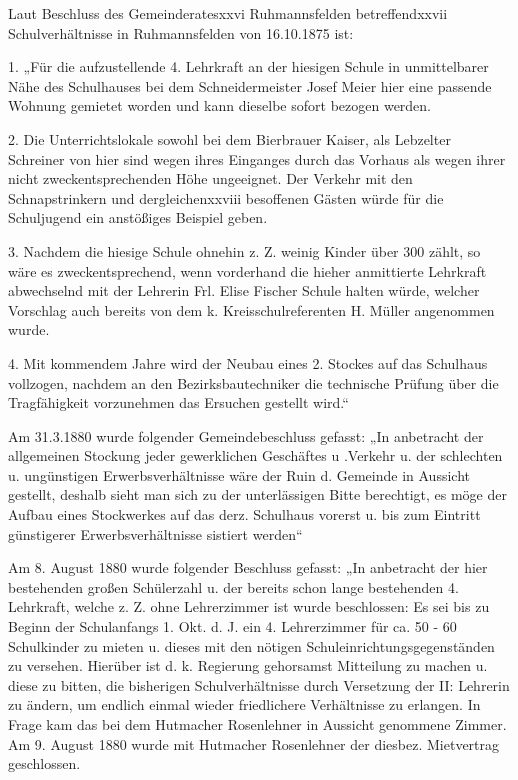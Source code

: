 \documentclass{book}
\begin{document}
Laut Beschluss des Gemeinderatesxxvi Ruhmannsfelden betreffendxxvii
Schulverhältnisse in Ruhmannsfelden von 16.10.1875 ist:



1. „Für die aufzustellende 4. Lehrkraft an der hiesigen Schule in unmittelbarer
Nähe des Schulhauses bei dem Schneidermeister Josef Meier hier eine passende
Wohnung gemietet worden und kann dieselbe sofort bezogen werden.

2. Die Unterrichtslokale sowohl bei dem Bierbrauer Kaiser, als Lebzelter
Schreiner von hier sind wegen ihres Einganges durch das Vorhaus als wegen ihrer
nicht zweckentsprechenden Höhe ungeeignet. Der Verkehr mit den Schnapstrinkern
und dergleichenxxviii besoffenen Gästen würde für die Schuljugend ein anstößiges
Beispiel geben.

3. Nachdem die hiesige Schule ohnehin z. Z. weinig Kinder über 300 zählt, so
wäre es zweckentsprechend, wenn vorderhand die hieher anmittierte Lehrkraft
abwechselnd mit der Lehrerin Frl. Elise Fischer Schule halten würde, welcher
Vorschlag auch bereits von dem k. Kreisschulreferenten H. Müller angenommen
wurde.

4. Mit kommendem Jahre wird der Neubau eines 2. Stockes auf das Schulhaus
vollzogen, nachdem an den Bezirksbautechniker die technische Prüfung über die
Tragfähigkeit vorzunehmen das Ersuchen gestellt wird.“



Am 31.3.1880 wurde folgender Gemeindebeschluss gefasst: „In anbetracht der
allgemeinen Stockung jeder gewerklichen Geschäftes u .Verkehr u. der schlechten
u. ungünstigen Erwerbsverhältnisse wäre der Ruin d. Gemeinde in Aussicht
gestellt, deshalb sieht man sich zu der unterlässigen Bitte berechtigt, es möge
der Aufbau eines Stockwerkes auf das derz. Schulhaus vorerst u. bis zum Eintritt
günstigerer Erwerbsverhältnisse sistiert werden“

Am 8. August 1880 wurde folgender Beschluss gefasst: „In anbetracht der hier
bestehenden großen Schülerzahl u. der bereits schon lange bestehenden 4.
Lehrkraft, welche z. Z. ohne Lehrerzimmer ist wurde beschlossen: Es sei bis zu
Beginn der Schulanfangs 1. Okt. d. J. ein 4. Lehrerzimmer für ca. 50 - 60
Schulkinder zu mieten u. dieses mit den nötigen Schuleinrichtungsgegenständen zu
versehen. Hierüber ist d. k. Regierung gehorsamst Mitteilung zu machen u. diese
zu bitten, die bisherigen Schulverhältnisse durch Versetzung der II: Lehrerin zu
ändern, um endlich einmal wieder friedlichere Verhältnisse zu erlangen. In Frage
kam das bei dem Hutmacher Rosenlehner in Aussicht genommene Zimmer. Am 9. August
1880 wurde mit Hutmacher Rosenlehner der diesbez. Mietvertrag geschlossen.
\end{document}
